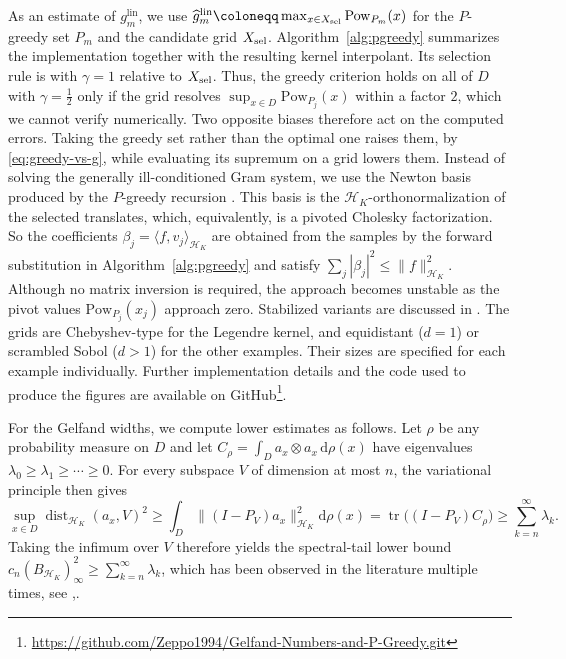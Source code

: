 \documentclass[11pt,reqno, a4paper]{article}
\numberwithin{equation}{section}
\newcommand{\lin}{\ensuremath{\mathrm{lin}}}
\newcommand{\ip}[2]{\langle #1,#2\rangle}
\newcommand{\norm}[1]{\lVert #1\rVert}
\begin{document}
As an estimate of $g_m^{\lin}$, we use
$\widehat g_m^{\lin}\coloneqq\max_{x\in X_{\rm sel}}\mathrm{Pow}_{P_m}(x)$
for the $P$-greedy set $P_m$ and the candidate grid $X_{\rm sel}$.
Algorithm~\ref{alg:pgreedy} summarizes the implementation together with the resulting kernel interpolant.
Its selection rule is with $\gamma=1$ relative to $X_{\rm sel}$.
Thus, the greedy criterion holds on all of $D$ with $\gamma=\tfrac12$ only if the grid resolves $\sup_{x \in D}\mathrm{Pow}_{P_j}(x)$ within a factor $2$, which we cannot verify numerically.
Two opposite biases therefore act on the computed  errors. Taking the greedy set rather than the optimal one raises them, by \eqref{eq:greedy-vs-g}, while evaluating its supremum on a grid lowers them.
Instead of solving the generally ill-conditioned Gram system, we use the Newton basis produced by the $P$-greedy recursion \cite{MS09,PS11}.
This basis is the $\mathcal H_K$-orthonormalization of the selected translates, which, equivalently, is a pivoted Cholesky factorization.
So the coefficients $\beta_j=\ip{f}{v_j}_{\mathcal H_K}$ are obtained from the samples by the forward substitution in Algorithm~\ref{alg:pgreedy} and satisfy $\sum_j|\beta_j|^2\le\norm{f}_{\mathcal H_K}^2$. Although no matrix inversion is required, the approach becomes unstable as the pivot values $\mathrm{Pow}_{P_j}(x_j)$ approach zero.
Stabilized variants are discussed in \cite{WSH21}.
The grids are Chebyshev-type for the Legendre kernel, and equidistant ($d=1$) or scrambled Sobol ($d>1$) for the other examples.
Their sizes are specified for each example individually.
Further implementation details and the code used to produce the figures are available on GitHub\footnote{\url{https://github.com/Zeppo1994/Gelfand-Numbers-and-P-Greedy.git}}.

For the Gelfand widths, we compute lower estimates as follows.
Let $\rho$ be any probability measure on $D$ and let $C_\rho=\int_D a_x\otimes a_x\,\mathrm d\rho(x)$ have eigenvalues $\lambda_0\geq\lambda_1\geq\cdots\geq0$.
For every subspace $V$ of dimension at most $n$, the variational principle then gives
\begin{equation}\label{eq:SpectralTailBound}
\sup_{x\in D}\operatorname{dist}_{\mathcal H_K}(a_x,V)^2
 \geq \int_D\|(I-P_V)a_x\|_{\mathcal H_K}^2 \mathrm d\rho(x)
 =\operatorname{tr}\bigl((I-P_V)C_\rho\bigr)
 \geq\sum_{k=n}^\infty\lambda_k.
\end{equation}
Taking the infimum over $V$ therefore yields the spectral-tail lower bound $c_n(B_{\mathcal H_K})_\infty^2\geq\sum_{k=n}^\infty\lambda_k$, which has been observed in the literature multiple times, see \cite{CoKuSi16},\cite{OP95}.
\end{document}

